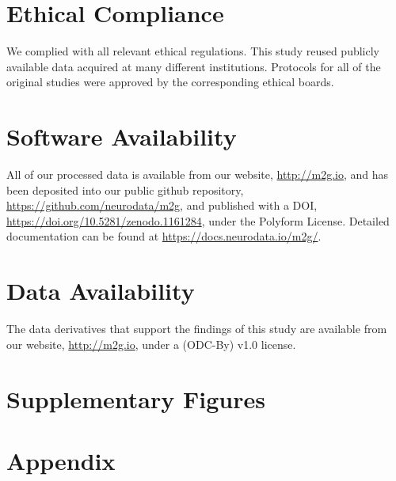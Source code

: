 \section{Ethical Compliance}
We complied with all relevant ethical regulations. This study reused publicly available data acquired at many different institutions. Protocols for all of the original studies were approved by the corresponding ethical boards.

\section{Software Availability}
All of our processed data is available from our website, \url{http://m2g.io}, and has been deposited into our public github repository, \url{https://github.com/neurodata/m2g}, and published with a DOI, \url{https://doi.org/10.5281/zenodo.1161284}, under the Polyform License. Detailed documentation can be found at \url{https://docs.neurodata.io/m2g/}.

\section{Data Availability}
The data derivatives that support the findings of this study are available from our website, \url{http://m2g.io},  under a (ODC-By) v1.0 license.


\section{Supplementary Figures}

\section{Appendix}

